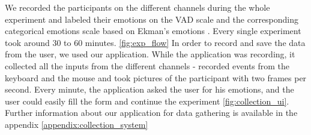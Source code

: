 We recorded the participants on the different channels during the whole experiment and labeled their emotions on the VAD scale \cite{VAD_model} 
and the corresponding categorical emotions scale based on Ekman's emotions \cite{Ekman_Theory}. 
Every single experiment took around 30 to 60 minutes. \ref{fig:exp_flow}
In order to record and save the data from the user, 
we used our application. While the application was recording, it collected all the inputs from the different channels - recorded events from the keyboard 
and the mouse and took pictures of the participant with two frames per second. Every minute, 
the application asked the user for his emotions, and the user could easily fill the form and continue the experiment \ref{fig:collection_ui}. 
Further information about our application for data gathering is available in the appendix \ref{appendix:collection_system}


